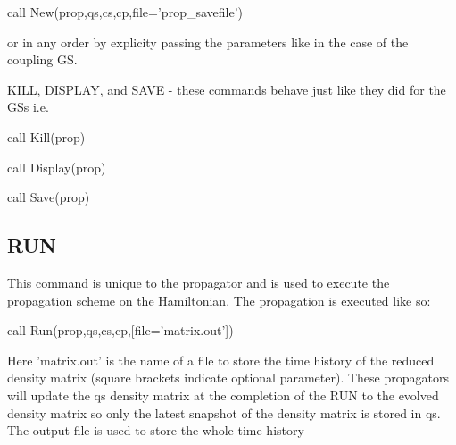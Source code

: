  \par
 call New(prop,qs,cs,cp,file='prop\-\_\-savefile')\par
 or in any order by explicity passing the parameters like in the case of the coupling G\-S.\par
 K\-I\-L\-L, D\-I\-S\-P\-L\-A\-Y, and S\-A\-V\-E -\/ these commands behave just like they did for the G\-Ss i.\-e.\par
 \par
 call Kill(prop)\par
 call Display(prop)\par
 call Save(prop)\par
 \par
 \hypertarget{_interface_RUN}{}\subsection{R\-U\-N}\label{_interface_RUN}
This command is unique to the propagator and is used to execute the propagation scheme on the Hamiltonian. The propagation is executed like so\-:\par
 \par
 call Run(prop,qs,cs,cp,\mbox{[}file='matrix.\-out'\mbox{]})\par
 \par
 Here 'matrix.\-out' is the name of a file to store the time history of the reduced density matrix (square brackets indicate optional parameter). These propagators will update the qs density matrix at the completion of the R\-U\-N to the evolved density matrix so only the latest snapshot of the density matrix is stored in qs. The output file is used to store the whole time history\par
 \par

